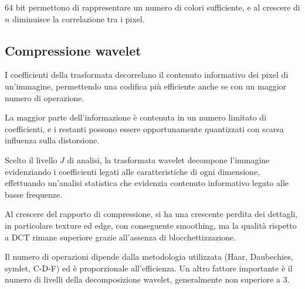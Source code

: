 64 bit permettono di rappresentare un numero di colori sufficiente, e al crescere di $n$ diminuisce la correlazione tra i pixel.

\newpage
\subsection{Compressione wavelet}
I coefficienti della trasformata decorrelano il contenuto informativo dei pixel di un'immagine, permettendo una codifica più efficiente anche se con un maggior numero di operazione.

La maggior parte dell'informazione è contenuta in un numero limitato di coefficienti, e i restanti possono essere opportunamente quantizzati con scarsa influenza sulla distorsione.

Scelto il livello $J$ di analisi, la trasformata wavelet decompone l'immagine evidenziando i coefficienti legati alle caratteristiche di ogni dimensione, effettuando un'analisi statistica che evidenzia contenuto informativo legato alle basse frequenze.

Al crescere del rapporto di compressione, si ha una crescente perdita dei dettagli, in particolare texture ed edge, con conseguente smoothing, ma la qualità rispetto a DCT rimane superiore grazie all'assenza di blocchettizzazione.

Il numero di operazioni dipende dalla metodologia utilizzata (Haar, Daubechies, symlet, C-D-F) ed è  proporzionale all'efficienza. Un altro fattore importante è il numero di livelli della decomposizione wavelet, generalmente non superiore a 3.



